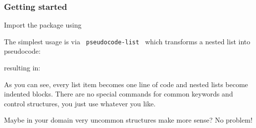 \subsubsection{Getting started}\label{getting-started}

Import the package using

\begin{Shaded}
\begin{Highlighting}[]
\end{Highlighting}
\end{Shaded}

The simplest usage is via \texttt{\ pseudocode-list\ } which transforms
a nested list into pseudocode:

\begin{Shaded}
\begin{Highlighting}[]
\NormalTok{\#pseudocode{-}list[}
\NormalTok{]}
\end{Highlighting}
\end{Shaded}

resulting in:

\pandocbounded{}

As you can see, every list item becomes one line of code and nested
lists become indented blocks. There are no special commands for common
keywords and control structures, you just use whatever you like.

Maybe in your domain very uncommon structures make more sense? No
problem!

\begin{Shaded}
\begin{Highlighting}[]
\NormalTok{\#pseudocode{-}list[}
\NormalTok{]}
\end{Highlighting}
\end{Shaded}

